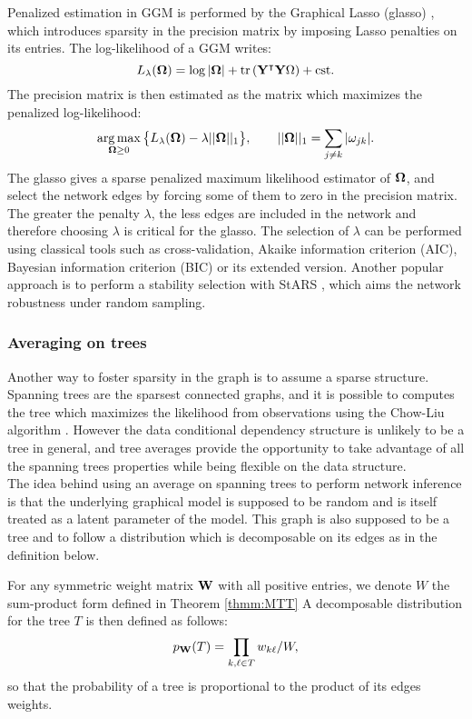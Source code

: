  Penalized estimation in GGM is performed by the Graphical Lasso (glasso) \citep{glasso}, which introduces sparsity in the precision matrix by imposing Lasso penalties on its entries. The log-likelihood of a GGM writes:
 $$L_\lambda({\boldsymbol{\Omega}}) = \log |{\boldsymbol{\Omega}}| +\rm tr\left( {\bf Y}^\intercal {\bf Y} {\boldsymbol{\Omega}} \right)+cst .$$
 The precision matrix is then estimated as the matrix which maximizes the penalized log-likelihood:
 $$\operatorname*{arg\,max}_{{\boldsymbol{\Omega}}\geq 0} \big\{L_\lambda({\boldsymbol{\Omega}}) - \lambda ||{\boldsymbol{\Omega}}||_1\big\}, \qquad ||{\boldsymbol{\Omega}}||_1 = \sum_{j\neq k} |\omega_{jk}|.$$
The glasso gives a sparse penalized maximum likelihood estimator of ${\boldsymbol{\Omega}}$, and select the network edges by forcing some of them to zero in the precision matrix. The greater the penalty $\lambda$, the less edges are included in the network and therefore choosing $\lambda$ is critical for the glasso. The selection of $\lambda$ can be performed using classical tools such as cross-validation, Akaike information criterion (AIC),  Bayesian information criterion (BIC) or its extended version.  Another popular approach is to perform a stability selection with StARS \citep{stars}, which aims the network robustness under random sampling.


 
 \subsubsection{Averaging on trees}
  Another way to foster sparsity in the graph is to assume a sparse structure. Spanning trees are the sparsest connected graphs, and it is possible to computes the tree which maximizes the likelihood from observations using  the Chow-Liu algorithm \citep{ChowLiu}. However the data conditional dependency structure is unlikely to be a tree in general, and tree averages provide the opportunity to take advantage of all the spanning trees properties while being flexible on the data structure. \\

 The idea behind using an average on spanning trees to perform network inference  is that the underlying graphical model is supposed to be random and is itself treated as a latent parameter of the model. This graph is also supposed to be a tree and to follow a distribution which is decomposable on its edges as in the definition below.
\begin{definition}
For any symmetric weight matrix ${\bf W}$ with all positive entries, we denote $W$ the sum-product form defined in Theorem \ref{thmm:MTT} A decomposable  distribution for the tree $T$ is then defined as follows:
$$p_{{\bf W}}(T) = \prod_{k,\ell \in T} w_{k\ell} / W ,$$
so that the probability of a tree is proportional to the product of its edges weights.
\end{definition}

